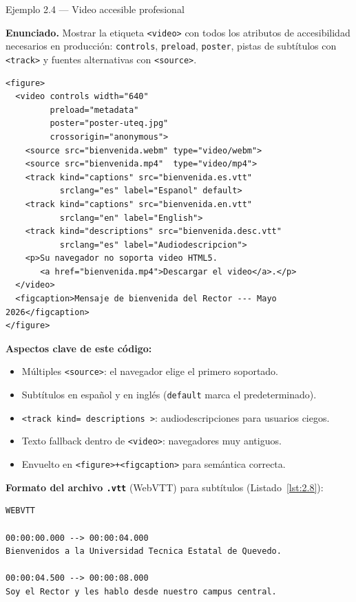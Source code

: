 \documentclass[11pt,a4paper,openany]{book}
\begin{document}
\begin{cajaejemplo}{Ejemplo 2.4 --- Video accesible profesional}

\textbf{Enunciado.} Mostrar la etiqueta \texttt{<video>} con todos los atributos de accesibilidad necesarios en producción: \texttt{controls}, \texttt{preload}, \texttt{poster}, pistas de subtítulos con \texttt{<track>} y fuentes alternativas con \texttt{<source>}.

\begin{lstlisting}[style=html,caption={Ejemplo de HTML},label=lst:2.7]
<figure>
  <video controls width="640"
         preload="metadata"
         poster="poster-uteq.jpg"
         crossorigin="anonymous">
    <source src="bienvenida.webm" type="video/webm">
    <source src="bienvenida.mp4"  type="video/mp4">
    <track kind="captions" src="bienvenida.es.vtt"
           srclang="es" label="Espanol" default>
    <track kind="captions" src="bienvenida.en.vtt"
           srclang="en" label="English">
    <track kind="descriptions" src="bienvenida.desc.vtt"
           srclang="es" label="Audiodescripcion">
    <p>Su navegador no soporta video HTML5.
       <a href="bienvenida.mp4">Descargar el video</a>.</p>
  </video>
  <figcaption>Mensaje de bienvenida del Rector --- Mayo 2026</figcaption>
</figure>
\end{lstlisting}

\textbf{Aspectos clave de este código:}
\begin{itemize}
\item Múltiples \texttt{<source>}: el navegador elige el primero
soportado.
\item Subtítulos en español y en inglés (\texttt{default} marca el
predeterminado).
\item \texttt{<track kind= descriptions >}: audiodescripciones para
usuarios ciegos.
\item Texto fallback dentro de \texttt{<video>}: navegadores muy
antiguos.
\item Envuelto en \texttt{<figure>+<figcaption>} para semántica
correcta.
\end{itemize}

\textbf{Formato del archivo \texttt{.vtt}} (WebVTT) para subtítulos (Listado~\ref{lst:2.8}):
\begin{lstlisting}[style=shell,caption={bienvenida.es.vtt},label=lst:2.8]
WEBVTT

00:00:00.000 --> 00:00:04.000
Bienvenidos a la Universidad Tecnica Estatal de Quevedo.

00:00:04.500 --> 00:00:08.000
Soy el Rector y les hablo desde nuestro campus central.
\end{lstlisting}
\end{cajaejemplo}
\end{document}
